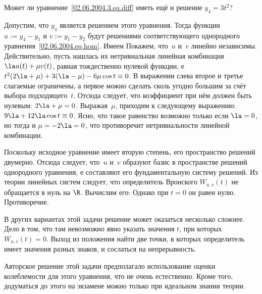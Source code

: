 \documentclass{article}
\begin{document}
\begin{problem}[2 балла]
Может ли уравнение~\eqref{02.06.2004.3.eq.diff} иметь ещё и решение $y_4 = 3t^2$?
\end{problem}
\begin{solution}
Допустим, что $y_4$ является решением этого уравнения. Тогда функции $u := y_4 - y_1$ и $v := y_1 - y_2$ будут
решениями соответствующего однородного уравнения~\eqref{02.06.2004.eq.hom}. Имеем
Покажем, что~$u$ и~$v$ линейно независимы. Действительно, пусть нашлась их нетривиальная линейная комбинация
$\la u(t) + \mu v(t)$, равная тождественно нулевой функции, е
$t^2(2\la + \mu) + 3(\la-\mu) -6\mu\cos t \equiv 0$. В выражении слева второе и третье слагаемые ограничены,
а первое можно сделать сколь угодно большим за счёт выбора подходящего~$t$. Отсюда следует,
что коэффициент при нём должен быть нулевым: $2\la + \mu = 0$. Выражая~$\mu$, приходим к следующему выражению:
$9\la + 12\la\cos t \equiv 0$. Ясно, что такое равенство возможно только если $\la = 0$, но тогда и $\mu = -2\la = 0$,
что противоречит нетривиальности линейной комбинации.

Поскольку исходное уравнение имеет вторую степень, его пространство решений двумерно. Отсюда следует, что~$u$ и~$v$
образуют базис в пространстве решений однородного уравнения, е составляют его фундаментальную систему решений.
Из теории линейных систем следует, что определитель Вронского $W_{u,v}(t)$ не обращается в нуль на $\R$.
Вычислим его:
Однако при $t=0$ он равен нулю. Противоречие.
\end{solution}

\begin{note}
В других вариантах этой задачи решение может оказаться несколько сложнее. Дело в том,
что там невозможно явно указать значения $t$, при которых $W_{u,v}(t) = 0$. Выход из положения
найти две точки, в которых определитель имеет значения разных знаков, и сослаться на непрерывность.
\end{note}

\begin{note}
Авторское решение этой задачи предполагало использование оценки колеблемости для этого уравнения,
что не очень естественно. Кроме того, додуматься до этого на экзамене можно
только при идеальном знании теории.
\end{note}
\end{document}
